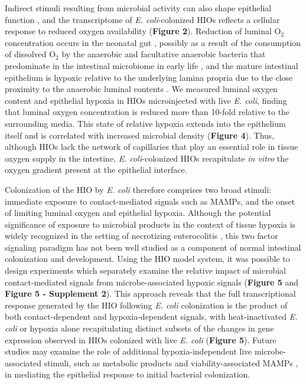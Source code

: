 \documentclass[9pt,lineo]{elife}
\begin{document}
Indirect stimuli resulting from microbial activity can also shape epithelial function \citep{Buffie:2013}, and the transcriptome of \emph{E. coli}-colonized HIOs reflects a cellular response to reduced oxygen availability (\textbf{Figure 2}). Reduction of luminal O\(_{\text{2}}\) concentration occurs in the neonatal gut \citep{Gruette:1965,Fisher:2013,Zheng:2015}, possibly as a result of the consumption of dissolved O\(_{\text{2}}\) by the anaerobic and facultative anaerobic bacteria that predominate in the intestinal microbiome in early life \citep{Espey:2013,Fanaro:2003,Favier:2002,Palmer:2007}, and the mature intestinal epithelium is hypoxic relative to the underlying lamina propria due to the close proximity to the anaerobic luminal contents \citep{Glover:2016,Kelly:2015,Zheng:2015}. We measured luminal oxygen content and epithelial hypoxia in HIOs microinjected with live \emph{E. coli}, finding that luminal oxygen concentration is reduced more than 10-fold relative to the surrounding media. This state of relative hypoxia extends into the epithelium itself and is correlated with increased microbial density (\textbf{Figure 4}). Thus, although HIOs lack the network of capillaries that play an essential role in tissue oxygen supply in the intestine, \emph{E. coli}-colonized HIOs recapitulate \emph{in vitro} the oxygen gradient present at the epithelial interface.

Colonization of the HIO by \emph{E. coli} therefore comprises two broad stimuli: immediate exposure to contact-mediated signals such as MAMPs, and the onset of limiting luminal oxygen and epithelial hypoxia. Although the potential significance of exposure to microbial products in the context of tissue hypoxia is widely recognized in the setting of necrotizing enterocolitis \citep{Tanner:2015,Afrazi:2014,Hackam:2013,Neu:2011,Upperman:2005,Nanthakumar:2011}, this two factor signaling paradigm has not been well studied as a component of normal intestinal colonization and development. Using the HIO model system, it was possible to design experiments which separately examine the relative impact of microbial contact-mediated signals from microbe-associated hypoxic signals (\textbf{Figure 5} and \textbf{Figure 5 - Supplement 2}). This approach reveals that the full transcriptional response generated by the HIO following \emph{E. coli} colonization is the product of both contact-dependent and hypoxia-dependent signals, with heat-inactivated \emph{E. coli} or hypoxia alone recapitulating distinct subsets of the changes in gene expression observed in HIOs colonized with live \emph{E. coli} (\textbf{Figure 5}). Future studies may examine the role of additional hypoxia-independent live microbe-associated stimuli, such as metabolic products \citep{Kaiko:2016} and viability-associated MAMPs \citep{Sander:2011}, in mediating the epithelial response to initial bacterial colonization.
\end{document}
